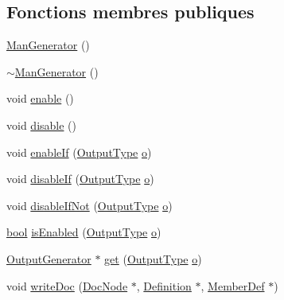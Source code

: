 \subsection*{Fonctions membres publiques}
\begin{DoxyCompactItemize}
\item 
\hyperlink{class_man_generator_ad234c57631aa6f20632d21fbcc300a4c}{Man\+Generator} ()
\item 
\hyperlink{class_man_generator_ab6edf1539db9429fdb029a94074a5271}{$\sim$\+Man\+Generator} ()
\item 
void \hyperlink{class_man_generator_a952257b104ee73181e50ac3617e6c8ba}{enable} ()
\item 
void \hyperlink{class_man_generator_a8e677c969a92c05ad55e89383215e9a4}{disable} ()
\item 
void \hyperlink{class_man_generator_a6a9253a0f036c4f8fbb9c8dc908d36e2}{enable\+If} (\hyperlink{class_output_generator_ab79b5d3c19d95c8a5929c07f5b2918cf}{Output\+Type} \hyperlink{060__command__switch_8tcl_a495e7a4ede0831107e9d435080a7c268}{o})
\item 
void \hyperlink{class_man_generator_a3730f076f025f7969c1e804c553a1201}{disable\+If} (\hyperlink{class_output_generator_ab79b5d3c19d95c8a5929c07f5b2918cf}{Output\+Type} \hyperlink{060__command__switch_8tcl_a495e7a4ede0831107e9d435080a7c268}{o})
\item 
void \hyperlink{class_man_generator_a840a5fe6338fc2ff32570933e6a6b741}{disable\+If\+Not} (\hyperlink{class_output_generator_ab79b5d3c19d95c8a5929c07f5b2918cf}{Output\+Type} \hyperlink{060__command__switch_8tcl_a495e7a4ede0831107e9d435080a7c268}{o})
\item 
\hyperlink{qglobal_8h_a1062901a7428fdd9c7f180f5e01ea056}{bool} \hyperlink{class_man_generator_ab1988ae55ad31aa4314452d277cd8d47}{is\+Enabled} (\hyperlink{class_output_generator_ab79b5d3c19d95c8a5929c07f5b2918cf}{Output\+Type} \hyperlink{060__command__switch_8tcl_a495e7a4ede0831107e9d435080a7c268}{o})
\item 
\hyperlink{class_output_generator}{Output\+Generator} $\ast$ \hyperlink{class_man_generator_a00f9039d2fae7e493948ade8f7ba4062}{get} (\hyperlink{class_output_generator_ab79b5d3c19d95c8a5929c07f5b2918cf}{Output\+Type} \hyperlink{060__command__switch_8tcl_a495e7a4ede0831107e9d435080a7c268}{o})
\item 
void \hyperlink{class_man_generator_adfcb88add542e7342f4b8c3faa737511}{write\+Doc} (\hyperlink{class_doc_node}{Doc\+Node} $\ast$, \hyperlink{class_definition}{Definition} $\ast$, \hyperlink{class_member_def}{Member\+Def} $\ast$)

\end{DoxyCompactItemize}
